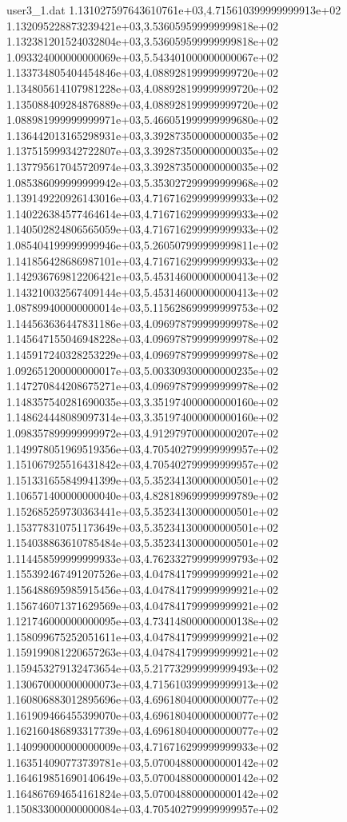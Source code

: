 \begin{filecontents}{user3_1.dat}
1.131027597643610761e+03,4.715610399999999913e+02
1.132095228873239421e+03,3.536059599999999818e+02
1.132381201524032804e+03,3.536059599999999818e+02
1.093324000000000069e+03,5.543401000000000067e+02
1.133734805404454846e+03,4.088928199999999720e+02
1.134805614107981228e+03,4.088928199999999720e+02
1.135088409284876889e+03,4.088928199999999720e+02
1.088981999999999971e+03,5.466051999999999680e+02
1.136442013165298931e+03,3.392873500000000035e+02
1.137515999342722807e+03,3.392873500000000035e+02
1.137795617045720974e+03,3.392873500000000035e+02
1.085386099999999942e+03,5.353027299999999968e+02
1.139149220926143016e+03,4.716716299999999933e+02
1.140226384577464614e+03,4.716716299999999933e+02
1.140502824806565059e+03,4.716716299999999933e+02
1.085404199999999946e+03,5.260507999999999811e+02
1.141856428686987101e+03,4.716716299999999933e+02
1.142936769812206421e+03,5.453146000000000413e+02
1.143210032567409144e+03,5.453146000000000413e+02
1.087899400000000014e+03,5.115628699999999753e+02
1.144563636447831186e+03,4.096978799999999978e+02
1.145647155046948228e+03,4.096978799999999978e+02
1.145917240328253229e+03,4.096978799999999978e+02
1.092651200000000017e+03,5.003309300000000235e+02
1.147270844208675271e+03,4.096978799999999978e+02
1.148357540281690035e+03,3.351974000000000160e+02
1.148624448089097314e+03,3.351974000000000160e+02
1.098357899999999972e+03,4.912979700000000207e+02
1.149978051969519356e+03,4.705402799999999957e+02
1.151067925516431842e+03,4.705402799999999957e+02
1.151331655849941399e+03,5.352341300000000501e+02
1.106571400000000040e+03,4.828189699999999789e+02
1.152685259730363441e+03,5.352341300000000501e+02
1.153778310751173649e+03,5.352341300000000501e+02
1.154038863610785484e+03,5.352341300000000501e+02
1.114458599999999933e+03,4.762332799999999793e+02
1.155392467491207526e+03,4.047841799999999921e+02
1.156488695985915456e+03,4.047841799999999921e+02
1.156746071371629569e+03,4.047841799999999921e+02
1.121746000000000095e+03,4.734148000000000138e+02
1.158099675252051611e+03,4.047841799999999921e+02
1.159199081220657263e+03,4.047841799999999921e+02
1.159453279132473654e+03,5.217732999999999493e+02
1.130670000000000073e+03,4.715610399999999913e+02
1.160806883012895696e+03,4.696180400000000077e+02
1.161909466455399070e+03,4.696180400000000077e+02
1.162160486893317739e+03,4.696180400000000077e+02
1.140990000000000009e+03,4.716716299999999933e+02
1.163514090773739781e+03,5.070048800000000142e+02
1.164619851690140649e+03,5.070048800000000142e+02
1.164867694654161824e+03,5.070048800000000142e+02
1.150833000000000084e+03,4.705402799999999957e+02

\end{filecontents}
